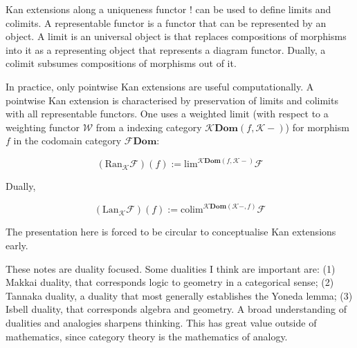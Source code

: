 \documentclass[10pt]{article}
\theoremstyle{plain}%
\theoremstyle{definition}
\theoremstyle{remark}
\begin{document}
Kan extensions along a uniqueness functor $\mathbf{!}$ can be used to define limits and colimits. A representable functor is a functor that can be represented by an object. A limit is an universal object is that replaces compositions of morphisms into it as a representing object that represents a diagram functor. Dually, a colimit subsumes compositions of morphisms out of it.

In practice, only pointwise Kan extensions are useful computationally. A pointwise Kan extension is characterised by preservation of limits and colimits with all representable functors. One uses a weighted limit (with respect to a weighting functor $\mathcal{W}$ from a indexing category $\mathcal{K} \mathbf{Dom}(f, \mathcal{K}-)$) for morphism $f$ in the codomain category $\mathcal{F} \mathbf{Dom}$:

\begin{equation}
    (\mathrm{Ran}_\mathcal{K} \mathcal{F})(f)
    :=
    \mathrm{lim}^{\mathcal{K} \mathbf{Dom}(f, \mathcal{K}-)} \mathcal{F}
\end{equation}

Dually,

\begin{equation}
    (\mathrm{Lan}_\mathcal{K} \mathcal{F})(f)
    :=
    \mathrm{colim}^{\mathcal{K} \mathbf{Dom}(\mathcal{K}-, f)} \mathcal{F}
\end{equation}

The presentation here is forced to be circular to conceptualise Kan extensions early. 

These notes are duality focused. Some dualities I think are important are: (1) Makkai duality, that corresponds logic to geometry in a categorical sense; (2) Tannaka duality, a duality that most generally establishes the Yoneda lemma; (3) Isbell duality, that corresponds algebra and geometry. A broad understanding of dualities and analogies sharpens thinking. This has great value outside of mathematics, since category theory is the mathematics of analogy.
\end{document}
